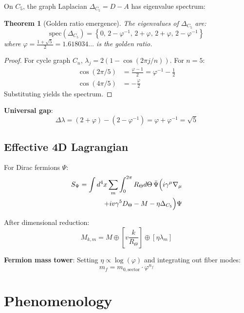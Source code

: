 \documentclass[twocolumn,preprintnumbers,amsmath,amssymb,superscriptaddress]{revtex4-2}
\newtheorem{theorem}{Theorem}[section]
\newcommand{\Cfive}{C_5}
\newcommand{\varphig}{\varphi}
\newcommand{\Lap}{\Delta}
\newcommand{\Rtheta}{R_\Theta}
\begin{document}
On $\Cfive$, the graph Laplacian $\Lap_{C_5} = D - A$ has eigenvalue spectrum:
\begin{theorem}[Golden ratio emergence]
\label{thm:phi}
The eigenvalues of $\Lap_{C_5}$ are:
\begin{equation}
\boxed{\text{spec}(\Lap_{C_5}) = \left\{0,\, 2 - \varphig^{-1},\, 2 + \varphig,\, 2 + \varphig,\, 2 - \varphig^{-1}\right\}}
\end{equation}
where $\varphig = \frac{1+\sqrt{5}}{2} = 1.618034\ldots$ is the golden ratio.
\end{theorem}

\begin{proof}
For cycle graph $C_n$, $\lambda_j = 2(1 - \cos(2\pi j/n))$. For $n=5$:
\begin{align}
\cos(2\pi/5) &= \frac{\varphig - 1}{2} = \varphig^{-1} - \frac{1}{2} \\
\cos(4\pi/5) &= -\frac{\varphig}{2}
\end{align}
Substituting yields the spectrum.
\end{proof}

\textbf{Universal gap}:
\begin{equation}
\Delta\lambda = (2 + \varphig) - (2 - \varphig^{-1}) = \varphig + \varphig^{-1} = \sqrt{5}
\end{equation}

\subsection{Effective 4D Lagrangian}

For Dirac fermions $\Psi$:
\begin{align}
S_\Psi = \int d^4x \sum_m \int_0^{2\pi} \Rtheta d\Theta \, \bar{\Psi} \Big( i\gamma^\mu \nabla_\mu \notag \\
+ iv\gamma^5 D_\Theta - M - \eta \Lap_{C_5} \Big) \Psi
\end{align}

After dimensional reduction:
\begin{equation}
M_{k,m} = M \oplus \left[ v \frac{k}{\Rtheta} \right] \oplus \left[ \eta \lambda_m \right]
\end{equation}

\textbf{Fermion mass tower}: Setting $\eta \propto \log(\varphig)$ and integrating out fiber modes:
\begin{equation}
\boxed{m_f = m_{0,\text{sector}} \cdot \varphig^{n_f}}
\end{equation}

\section{Phenomenology}
\end{document}
